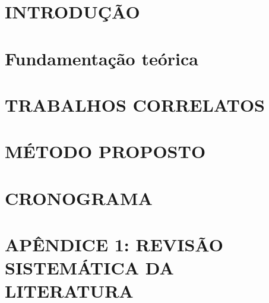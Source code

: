 \documentclass[
	12pt,				%
    oneside,
	a4paper,			%
	chapter=TITLE,		%
	english,			%
	brazil				%
	]{abntex2}
\begin{document}
\textual
\chapter{INTRODUÇÃO}


\chapter{Fundamentação teórica}


\chapter{TRABALHOS CORRELATOS}



\chapter{MÉTODO PROPOSTO}



\chapter{CRONOGRAMA}


\chapter{APÊNDICE 1: REVISÃO SISTEMÁTICA DA LITERATURA}

\newpage


\printindex
\end{document}
